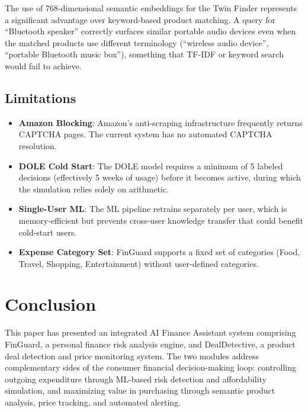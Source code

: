 \documentclass[]{IEEEtran}
\begin{document}
The use of 768-dimensional semantic embeddings for the Twin Finder represents a significant advantage over keyword-based product matching. A query for ``Bluetooth speaker'' correctly surfaces similar portable audio devices even when the matched products use different terminology (``wireless audio device'', ``portable Bluetooth music box''), something that TF-IDF or keyword search would fail to achieve.

\subsection{Limitations}

\begin{itemize}
    \item \textbf{Amazon Blocking}: Amazon's anti-scraping infrastructure frequently returns CAPTCHA pages. The current system has no automated CAPTCHA resolution.
    \item \textbf{DOLE Cold Start}: The DOLE model requires a minimum of 5 labeled decisions (effectively 5 weeks of usage) before it becomes active, during which the simulation relies solely on arithmetic.
    \item \textbf{Single-User ML}: The ML pipeline retrains separately per user, which is memory-efficient but prevents cross-user knowledge transfer that could benefit cold-start users.
    \item \textbf{Expense Category Set}: FinGuard supports a fixed set of categories (Food, Travel, Shopping, Entertainment) without user-defined categories.
\end{itemize}

\section{Conclusion}
\label{sec:conclusion}

This paper has presented an integrated AI Finance Assistant system comprising FinGuard, a personal finance risk analysis engine, and DealDetective, a product deal detection and price monitoring system. The two modules address complementary sides of the consumer financial decision-making loop: controlling outgoing expenditure through ML-based risk detection and affordability simulation, and maximizing value in purchasing through semantic product analysis, price tracking, and automated alerting.
\end{document}
